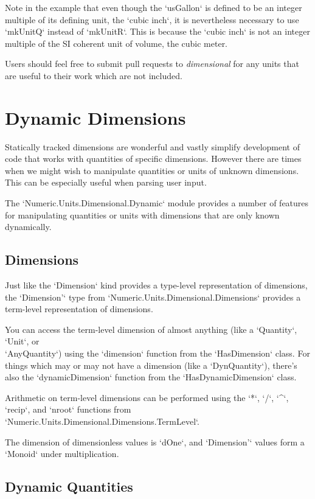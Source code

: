 \documentclass[11pt]{report}
\newcommand{\packagename}[1]{\textit{#1}}
\newcommand{\thispackage}{\packagename{dimensional}}
\begin{document}
Note in the example that even though the `usGallon` is defined to be an integer multiple of its defining unit, the `cubic inch`, it is nevertheless
necessary to use `mkUnitQ` instead of `mkUnitR`. This is because the `cubic inch` is not an integer multiple of the SI coherent unit of volume, the cubic meter.

Users should feel free to submit pull requests to \thispackage{} for any units that are useful to their work which are not included.




\chapter{Dynamic Dimensions}

Statically tracked dimensions are wonderful and vastly simplify development of code that works with quantities of specific
dimensions. However there are times when we might wish to manipulate quantities or units of unknown dimensions. This can be
especially useful when parsing user input.

The `Numeric.Units.Dimensional.Dynamic` module provides a number of features for manipulating quantities or units with dimensions that are only
known dynamically.

\section{Dimensions}

Just like the `Dimension` kind provides a type-level representation of dimensions, the `Dimension'` type from `Numeric.Units.Dimensional.Dimensions`
provides a term-level representation of dimensions.

You can access the term-level dimension of almost anything (like a `Quantity`, `Unit`, or \\
`AnyQuantity`) using the `dimension` function from the `HasDimension` class. For things
which may or may not have a dimension (like a `DynQuantity`), there's also the `dynamicDimension`
function from the `HasDynamicDimension` class.

Arithmetic on term-level dimensions can be performed using the `*`, `/`, `^`, `recip`, and `nroot` functions from `Numeric.Units.Dimensional.Dimensions.TermLevel`.

The dimension of dimensionless values is `dOne`, and `Dimension'` values form a `Monoid` under multiplication.

\section{Dynamic Quantities} \label{dynamic-quantities}
\end{document}
